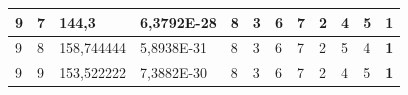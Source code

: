 \documentclass[conference]{IEEEtran}
\begin{document}
\begin{table}[]
\begin{tabular}{|llll|llllllll|}
\multicolumn{1}{|l|}{9}                                                     & \multicolumn{1}{l|}{7}                                                        & \multicolumn{1}{l|}{144,3}                                                        & 6,3792E-28                     & \multicolumn{1}{l|}{8}                                                  & \multicolumn{1}{l|}{3}                                                  & \multicolumn{1}{l|}{6}                                                  & \multicolumn{1}{l|}{7}                                                  & \multicolumn{1}{l|}{2}                                                  & \multicolumn{1}{l|}{4}                                                  & \multicolumn{1}{l|}{5}                                                  & \textbf{1}                 \\ \hline
\multicolumn{1}{|l|}{9}                                                     & \multicolumn{1}{l|}{8}                                                        & \multicolumn{1}{l|}{158,744444}                                                   & 5,8938E-31                     & \multicolumn{1}{l|}{8}                                                  & \multicolumn{1}{l|}{3}                                                  & \multicolumn{1}{l|}{6}                                                  & \multicolumn{1}{l|}{7}                                                  & \multicolumn{1}{l|}{2}                                                  & \multicolumn{1}{l|}{5}                                                  & \multicolumn{1}{l|}{4}                                                  & \textbf{1}                 \\ \hline
\multicolumn{1}{|l|}{9}                                                     & \multicolumn{1}{l|}{9}                                                        & \multicolumn{1}{l|}{153,522222}                                                   & 7,3882E-30                     & \multicolumn{1}{l|}{8}                                                  & \multicolumn{1}{l|}{3}                                                  & \multicolumn{1}{l|}{6}                                                  & \multicolumn{1}{l|}{7}                                                  & \multicolumn{1}{l|}{2}                                                  & \multicolumn{1}{l|}{4}                                                  & \multicolumn{1}{l|}{5}                                                  & \textbf{1}                 \\ \hline

\end{tabular}
\end{table}
\end{document}
